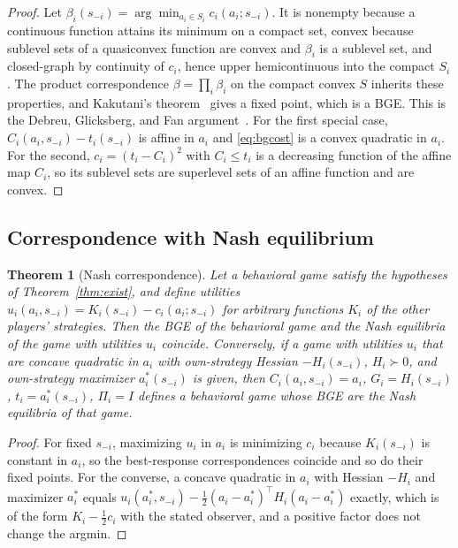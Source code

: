 \documentclass[11pt]{article}
\newtheorem{theorem}{Theorem}
\theoremstyle{definition}
\theoremstyle{remark}
\begin{document}
\begin{proof}
Let $\beta_{i}(s_{-i})=\arg\min_{a_{i}\in S_{i}}c_{i}(a_{i};s_{-i})$.
It is nonempty because a continuous function attains its minimum on a compact set, convex because sublevel sets of a quasiconvex function are convex and $\beta_{i}$ is a sublevel set, and closed-graph by continuity of $c_{i}$, hence upper hemicontinuous into the compact $S_{i}$.
The product correspondence $\beta=\prod_{i}\beta_{i}$ on the compact convex $S$ inherits these properties, and Kakutani's theorem~\cite{kakutani1941} gives a fixed point, which is a BGE.
This is the Debreu, Glicksberg, and Fan argument~\cite{debreu1952,glicksberg1952,fan1952}.
For the first special case, $C_{i}(a_{i},s_{-i})-t_{i}(s_{-i})$ is affine in $a_{i}$ and \eqref{eq:bgcost} is a convex quadratic in $a_{i}$.
For the second, $c_{i}=(t_{i}-C_{i})^{2}$ with $C_{i}\le t_{i}$ is a decreasing function of the affine map $C_{i}$, so its sublevel sets are superlevel sets of an affine function and are convex.
\end{proof}

\subsection{Correspondence with Nash equilibrium}

\begin{theorem}[Nash correspondence]
\label{thm:nash}
Let a behavioral game satisfy the hypotheses of Theorem~\ref{thm:exist}, and define utilities $u_{i}(a_{i},s_{-i})=K_{i}(s_{-i})-c_{i}(a_{i};s_{-i})$ for arbitrary functions $K_{i}$ of the other players' strategies. Then the BGE of the behavioral game and the Nash equilibria of the game with utilities $u_{i}$ coincide. Conversely, if a game with utilities $u_{i}$ that are concave quadratic in $a_{i}$ with own-strategy Hessian $-H_{i}(s_{-i})$, $H_{i}\succ0$, and own-strategy maximizer $a_{i}^{*}(s_{-i})$ is given, then $C_{i}(a_{i},s_{-i})=a_{i}$, $G_{i}=H_{i}(s_{-i})$, $t_{i}=a_{i}^{*}(s_{-i})$, $\Pi_{i}=I$ defines a behavioral game whose BGE are the Nash equilibria of that game.
\end{theorem}

\begin{proof}
For fixed $s_{-i}$, maximizing $u_{i}$ in $a_{i}$ is minimizing $c_{i}$ because $K_{i}(s_{-i})$ is constant in $a_{i}$, so the best-response correspondences coincide and so do their fixed points.
For the converse, a concave quadratic in $a_{i}$ with Hessian $-H_{i}$ and maximizer $a_{i}^{*}$ equals $u_{i}(a_{i}^{*},s_{-i})-\tfrac12(a_{i}-a_{i}^{*})^{\top}H_{i}(a_{i}-a_{i}^{*})$ exactly, which is of the form $K_{i}-\tfrac12c_{i}$ with the stated observer, and a positive factor does not change the argmin.
\end{proof}
\end{document}
